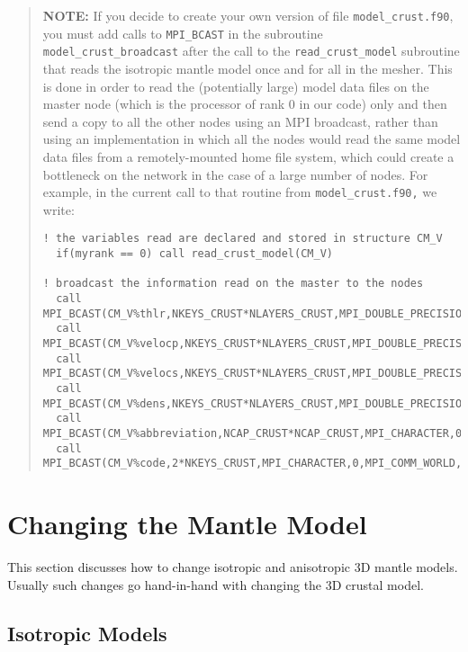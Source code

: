 \begin{quote}
\textbf{NOTE:} If you decide to create your own version of file \texttt{model\_crust.f90},
you must add calls to \texttt{MPI\_BCAST} in the subroutine \texttt{model\_crust\_broadcast}
after the call to the \texttt{read\_crust\_model} subroutine that
reads the isotropic mantle model once and for all in the mesher. This
is done in order to read the (potentially large) model data files
on the master node (which is the processor of rank 0 in our code)
only and then send a copy to all the other nodes using an MPI broadcast,
rather than using an implementation in which all the nodes would read
the same model data files from a remotely-mounted home file system,
which could create a bottleneck on the network in the case of a large
number of nodes. For example, in the current call to that routine
from \texttt{model\_crust.f90,} we write:

{\footnotesize
\begin{verbatim}
! the variables read are declared and stored in structure CM_V
  if(myrank == 0) call read_crust_model(CM_V)

! broadcast the information read on the master to the nodes
  call MPI_BCAST(CM_V%thlr,NKEYS_CRUST*NLAYERS_CRUST,MPI_DOUBLE_PRECISION,0,MPI_COMM_WORLD,ier)
  call MPI_BCAST(CM_V%velocp,NKEYS_CRUST*NLAYERS_CRUST,MPI_DOUBLE_PRECISION,0,MPI_COMM_WORLD,ier)
  call MPI_BCAST(CM_V%velocs,NKEYS_CRUST*NLAYERS_CRUST,MPI_DOUBLE_PRECISION,0,MPI_COMM_WORLD,ier)
  call MPI_BCAST(CM_V%dens,NKEYS_CRUST*NLAYERS_CRUST,MPI_DOUBLE_PRECISION,0,MPI_COMM_WORLD,ier)
  call MPI_BCAST(CM_V%abbreviation,NCAP_CRUST*NCAP_CRUST,MPI_CHARACTER,0,MPI_COMM_WORLD,ier)
  call MPI_BCAST(CM_V%code,2*NKEYS_CRUST,MPI_CHARACTER,0,MPI_COMM_WORLD,ier)
\end{verbatim}
}
\end{quote}

\section{Changing the Mantle Model}\label{sec:Changing-the-Mantle}

This section discusses how to change isotropic and anisotropic 3D
mantle models. Usually such changes go hand-in-hand with changing
the 3D crustal model.


\subsection{Isotropic Models}\label{sub:Isotropic-Models}

